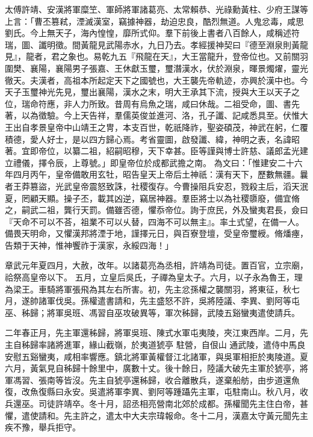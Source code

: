 \begin{pinyinscope}
 
太傅許靖、安漢將軍糜笁、軍師將軍諸葛亮、太常賴恭、光祿勳黃柱、少府王謀等上言：「曹丕篡弒，湮滅漢室，竊據神器，劫迫忠良，酷烈無道。人鬼忿毒，咸思劉氏。今上無天子，海內惶惶，靡所式仰。羣下前後上書者八百餘人，咸稱述符瑞，圖、讖明徵。間黃龍見武陽赤水，九日乃去。孝經援神契曰『德至淵泉則黃龍見』，龍者，君之象也。易乾九五『飛龍在天』，大王當龍升，登帝位也。又前關羽圍樊、襄陽，襄陽男子張嘉、王休獻玉璽，璽潛漢水，伏於淵泉，暉景燭燿，靈光徹天。夫漢者，高祖本所起定天下之國號也，大王襲先帝軌迹，亦興於漢中也。今天子玉璽神光先見，璽出襄陽，漢水之末，明大王承其下流，授與大王以天子之位，瑞命符應，非人力所致。昔周有烏魚之瑞，咸曰休哉。二祖受命，圖、書先著，以為徵驗。今上天告祥，羣儒英俊並進河、洛，孔子讖、記咸悉具至。伏惟大王出自孝景皇帝中山靖王之冑，本支百世，乾祇降祚，聖姿碩茂，神武在躬，仁覆積德，愛人好士，是以四方歸心焉。考省靈圖，啟發讖、緯，神明之表，名諱昭著。宜即帝位，以纂二祖，紹嗣昭穆，天下幸甚。臣等謹與博士許慈、議郎孟光建立禮儀，擇令辰，上尊號。」即皇帝位於成都武擔之南。
 為文曰：「惟建安二十六年四月丙午，皇帝備敢用玄牡，昭告皇天上帝后土神祇：漢有天下，歷數無疆。曩者王莽篡盜，光武皇帝震怒致誅，社稷復存。今曹操阻兵安忍，戮殺主后，滔天泯夏，罔顧天顯。操子丕，載其凶逆，竊居神器。羣臣將士以為社稷隳廢，備宜脩之，嗣武二祖，龔行天罰。備雖否德，懼忝帝位。詢于庶民，外及蠻夷君長，僉曰『天命不可以不荅，祖業不可以乆替，四海不可以無主』。率土式望，在備一人。備畏天明命，又懼漢邦將湮于地，謹擇元日，與百寮登壇，受皇帝璽綬。脩燔瘞，告類于天神，惟神饗祚于漢家，永綏四海！」
 
 
章武元年夏四月，大赦，改年。以諸葛亮為丞相，許靖為司徒。置百官，立宗廟，祫祭高皇帝以下。
 五月，立皇后吳氏，子禪為皇太子。六月，以子永為魯王，理為梁王。車騎將軍張飛為其左右所害。初，先主忿孫權之襲關羽，將東征，秋七月，遂帥諸軍伐吳。孫權遣書請和，先主盛怒不許，吳將陸議、李異、劉阿等屯巫、秭歸；將軍吳班、馮習自巫攻破異等，軍次秭歸，武陵五谿蠻夷遣使請兵。
 
 
二年春正月，先主軍還秭歸，將軍吳班、陳式水軍屯夷陵，夾江東西岸。二月，先主自秭歸率諸將進軍，緣山截嶺，於夷道猇亭
 駐營，自佷山
 通武陵，遣侍中馬良安慰五谿蠻夷，咸相率響應。鎮北將軍黃權督江北諸軍，與吳軍相拒於夷陵道。夏六月，黃氣見自秭歸十餘里中，廣數十丈。後十餘日，陸議大破先主軍於猇亭，將軍馮習、張南等皆沒。先主自猇亭還秭歸，收合離散兵，遂棄船舫，由步道還魚復，改魚復縣曰永安。吳遣將軍李異、劉阿等踵躡先主軍，屯駐南山。秋八月，收兵還巫。司徒許靖卒。冬十月，詔丞相亮營南北郊於成都。孫權聞先主住白帝，甚懼，遣使請和。先主許之，遣太中大夫宗瑋報命。冬十二月，漢嘉太守黃元聞先主疾不豫，舉兵拒守。
 

\end{pinyinscope}
